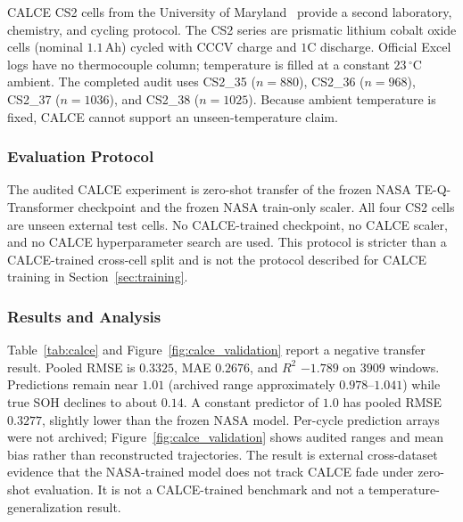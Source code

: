 CALCE CS2 cells from the University of Maryland~\citep{w9rg-7173-25} provide a second laboratory, chemistry, and cycling protocol. The CS2 series are prismatic lithium cobalt oxide cells (nominal $1.1$\,Ah) cycled with CCCV charge and $1$C discharge. Official Excel logs have no thermocouple column; temperature is filled at a constant $23\,^\circ$C ambient. The completed audit uses CS2\_35 ($n=880$), CS2\_36 ($n=968$), CS2\_37 ($n=1036$), and CS2\_38 ($n=1025$). Because ambient temperature is fixed, CALCE cannot support an unseen-temperature claim.

\subsubsection{Evaluation Protocol}
\label{sec:calce_protocol}

The audited CALCE experiment is zero-shot transfer of the frozen NASA TE-Q-Transformer checkpoint and the frozen NASA train-only scaler. All four CS2 cells are unseen external test cells. No CALCE-trained checkpoint, no CALCE scaler, and no CALCE hyperparameter search are used. This protocol is stricter than a CALCE-trained cross-cell split and is not the protocol described for CALCE training in Section~\ref{sec:training}.

\subsubsection{Results and Analysis}
\label{sec:calce_results}

Table~\ref{tab:calce} and Figure~\ref{fig:calce_validation} report a negative transfer result. Pooled RMSE is $0.3325$, MAE $0.2676$, and $R^2$ $-1.789$ on $3909$ windows. Predictions remain near $1.01$ (archived range approximately $0.978$--$1.041$) while true SOH declines to about $0.14$. A constant predictor of $1.0$ has pooled RMSE $0.3277$, slightly lower than the frozen NASA model. Per-cycle prediction arrays were not archived; Figure~\ref{fig:calce_validation} shows audited ranges and mean bias rather than reconstructed trajectories. The result is external cross-dataset evidence that the NASA-trained model does not track CALCE fade under zero-shot evaluation. It is not a CALCE-trained benchmark and not a temperature-generalization result.

